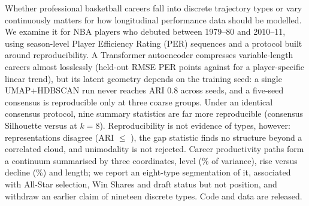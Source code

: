 Whether professional basketball careers fall into discrete trajectory types or vary continuously matters for how longitudinal performance data should be modelled. We examine it for \nPlayers{} NBA players who debuted between 1979--80 and 2010--11, using season-level Player Efficiency Rating (PER) sequences and a protocol built around reproducibility. A Transformer autoencoder compresses variable-length careers almost losslessly (held-out RMSE \rmseHeld{} PER points against \rmseLinear{} for a player-specific linear trend), but its latent geometry depends on the training seed: a single UMAP+HDBSCAN run never reaches ARI 0.8 across seeds, and a five-seed consensus is reproducible only at three coarse groups. Under an identical consensus protocol, nine summary statistics are far more reproducible (consensus Silhouette \summSilEight{} versus \aeAllSilEight{} at $k=8$). Reproducibility is not evidence of types, however: representations disagree (ARI $\le$ \xMax), the gap statistic finds no structure beyond a correlated cloud, and unimodality is not rejected. Career productivity paths form a continuum summarised by three coordinates, level (\pcOneVar\% of variance), rise versus decline (\pcTwoVar\%) and length; we report an eight-type segmentation of it, associated with All-Star selection, Win Shares and draft status but not position, and withdraw an earlier claim of nineteen discrete types. Code and data are released.